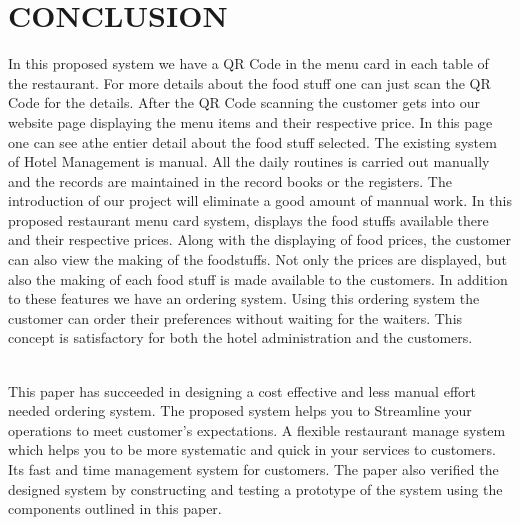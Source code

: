 \documentclass[12pt,a4paper]{report}
\begin{document}
\chapter{CONCLUSION}
\hspace{0.25cm}
\par
In this proposed system we have a QR Code in the menu card in each table of the
restaurant. For more details about the food stuff one can just scan the QR Code for the details.
After the QR Code scanning the customer gets into our website page displaying the menu items
and their respective price. In this page one can see athe entier detail about the food stuff selected.
The existing system of Hotel Management is manual. All the daily routines is carried out
manually and the records are maintained in the record books or the registers. The introduction of
our project will eliminate a good amount of mannual work. In this proposed restaurant menu card
system, displays the food stuffs available there and their respective prices. Along with the
displaying of food prices, the customer can also view the making of the foodstuffs. Not only the
prices are displayed, but also the making of each food stuff is made available to the customers. In
addition to these features we have an ordering system. Using this ordering system the customer
can order their preferences without waiting for the waiters. This concept is satisfactory for both
the hotel administration and the customers.
\\
\\
\par
This paper has succeeded in designing a cost effective and less manual effort needed ordering system. The proposed system helps you to Streamline your
operations to meet customer’s expectations. A flexible restaurant manage system which helps you to be more systematic and
quick in your services to customers. Its fast and time management system for customers. The paper also verified the designed system by constructing and testing a prototype of the system using the components outlined in this paper. 


\end{document}
